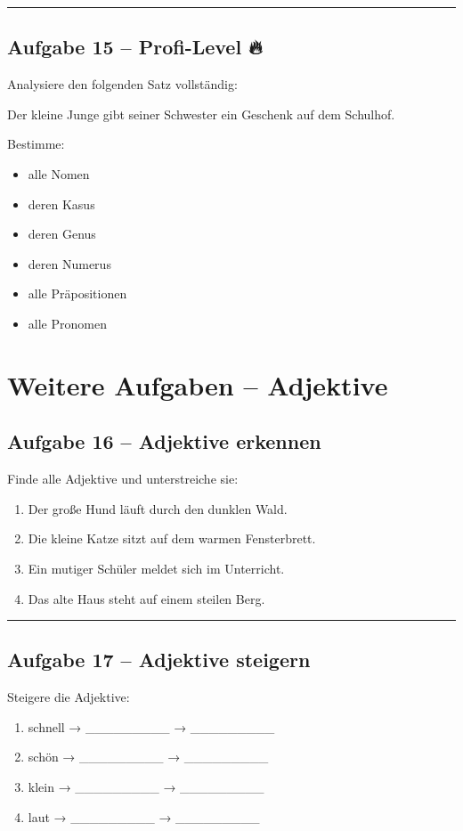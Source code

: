 \documentclass[a4paper,12pt]{article}
\newcommand{\linie}{\vspace{4pt}\hrule\vspace{10pt}}
\begin{document}
\linie

\subsection*{Aufgabe 15 – Profi-Level 🔥}

Analysiere den folgenden Satz vollständig:

Der kleine Junge gibt seiner Schwester ein Geschenk auf dem Schulhof.

Bestimme:
\begin{itemize}
\item alle Nomen
\item deren Kasus
\item deren Genus
\item deren Numerus
\item alle Präpositionen
\item alle Pronomen
\end{itemize}
\newpage
\section*{Weitere Aufgaben – Adjektive}

\subsection*{Aufgabe 16 – Adjektive erkennen}

Finde alle Adjektive und unterstreiche sie:

\begin{enumerate}
\item Der große Hund läuft durch den dunklen Wald.
\item Die kleine Katze sitzt auf dem warmen Fensterbrett.
\item Ein mutiger Schüler meldet sich im Unterricht.
\item Das alte Haus steht auf einem steilen Berg.
\end{enumerate}

\linie

\subsection*{Aufgabe 17 – Adjektive steigern}

Steigere die Adjektive:

\begin{enumerate}
\item schnell → \_\_\_\_\_\_\_\_\_ → \_\_\_\_\_\_\_\_\_
\item schön → \_\_\_\_\_\_\_\_\_ → \_\_\_\_\_\_\_\_\_
\item klein → \_\_\_\_\_\_\_\_\_ → \_\_\_\_\_\_\_\_\_
\item laut → \_\_\_\_\_\_\_\_\_ → \_\_\_\_\_\_\_\_\_
\end{enumerate}
\end{document}

